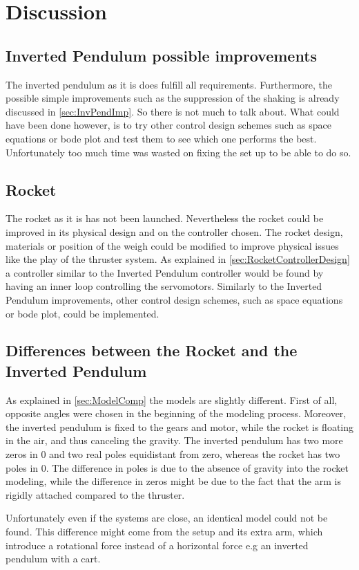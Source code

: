 \chapter{Discussion}\label{sec:Discussion}

\section{Inverted Pendulum possible improvements}

The inverted pendulum as it is does fulfill all requirements. Furthermore, the possible simple improvements such as the suppression of the shaking is already discussed in \autoref{sec:InvPendImp}. So there is not much to talk about. What could have been done however, is to try other control design schemes such as space equations or bode plot and test them to see which one performs the best. Unfortunately too much time was wasted on fixing the set up to be able to do so.

\section{Rocket}

The rocket as it is has not been launched. Nevertheless the rocket could be improved in its physical design and on the controller chosen. The rocket design, materials or position of the weigh could be modified to improve physical issues like the play of the thruster system. As explained in \autoref{sec:RocketControllerDesign} a controller similar to the Inverted Pendulum controller would be found by having an inner loop controlling the servomotors. Similarly to the Inverted Pendulum improvements, other control design schemes, such as space equations or bode plot, could be implemented.

\section{Differences between the Rocket and the Inverted Pendulum}

As explained in \autoref{sec:ModelComp} the models are slightly different. First of all, opposite angles were chosen in the beginning of the modeling process. Moreover, the inverted pendulum is fixed to the gears and motor, while the rocket is floating in the air, and thus canceling the gravity. The inverted pendulum has two more zeros in 0 and two real poles equidistant from zero, whereas the rocket has two poles in 0. The difference in poles is due to the absence of gravity into the rocket modeling, while the difference in zeros might be due to the fact that the arm is rigidly attached compared to the thruster.

Unfortunately even if the systems are close, an identical model could not be found. This difference might come from the setup and its extra arm, which introduce a rotational force instead of a horizontal force e.g an inverted pendulum with a cart.